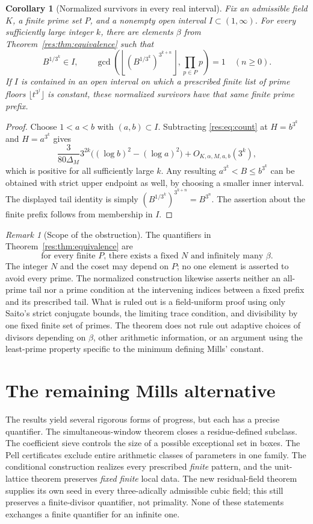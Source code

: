 \documentclass[11pt,a4paper]{article}
\newtheorem{corollary}[theorem]{Corollary}
\theoremstyle{remark}\newtheorem{remark}[theorem]{Remark}
\begin{document}
\begin{corollary}[Normalized survivors in every real interval]
\label{res:cor:normalized}
Fix an admissible field $K$, a finite prime set $P$, and a nonempty
open interval $I\subset(1,\infty)$. For every sufficiently large
integer $k$, there are elements $\beta$ from
Theorem~\ref{res:thm:equivalence} such that
\[
 B^{1/3^k}\in I,
 \qquad
 \gcd\left(\left\lfloor
    (B^{1/3^k})^{3^{k+n}}\right\rfloor,
    \prod_{p\in P}p\right)=1\quad(n\ge0).
\]
If $I$ is contained in an open interval on which a prescribed finite
list of prime floors $\lfloor t^{3^j}\rfloor$ is constant, these
normalized survivors have that same finite prime prefix.
\end{corollary}
\begin{proof}
Choose $1<a<b$ with $(a,b)\subset I$. Subtracting
\eqref{res:eq:count} at $H=b^{3^k}$ and $H=a^{3^k}$ gives
\[
 \frac{3}{80\Delta_M}3^{2k}
       \bigl((\log b)^2-(\log a)^2\bigr)+O_{K,\alpha,M,a,b}(3^k),
\]
which is positive for all sufficiently large $k$. Any resulting
$a^{3^k}<B\le b^{3^k}$ can be obtained with strict upper endpoint
as well, by choosing a smaller inner interval. The displayed tail
identity is simply
$(B^{1/3^k})^{3^{k+n}}=B^{3^n}$. The assertion about the finite
prefix follows from membership in $I$.
\end{proof}

\begin{remark}[Scope of the obstruction]
\label{res:rem:scope}
The quantifiers in Theorem~\ref{res:thm:equivalence} are
\[
 \text{for every finite }P\text{, there exists a fixed }N
 \text{ and infinitely many }\beta.
\]
The integer $N$ and the coset may depend on $P$; no one element
is asserted to avoid every prime. The normalized construction
likewise asserts neither an all-prime tail nor a prime condition
at the intervening indices between a fixed prefix and its prescribed
tail. What is ruled out is a field-uniform proof using only
Saito's strict conjugate bounds, the limiting trace condition, and
divisibility by one fixed finite set of primes. The theorem does not
rule out adaptive choices of divisors depending on $\beta$, other
arithmetic information, or an argument using the least-prime property
specific to the minimum defining Mills' constant.
\end{remark}


\section{The remaining Mills alternative}
The results yield several rigorous forms of progress, but each has
a precise quantifier. The simultaneous-window theorem closes a
residue-defined subclass. The coefficient sieve controls the size
of a possible exceptional set in boxes. The Pell certificates
exclude entire arithmetic classes of parameters in one family.
The conditional construction realizes every prescribed \emph{finite}
pattern, and the unit-lattice theorem preserves \emph{fixed finite}
local data. The new residual-field theorem supplies its own seed
in every three-adically admissible cubic field; this still preserves
a finite-divisor quantifier, not primality. None of these statements exchanges a finite quantifier
for an infinite one.
\end{document}
